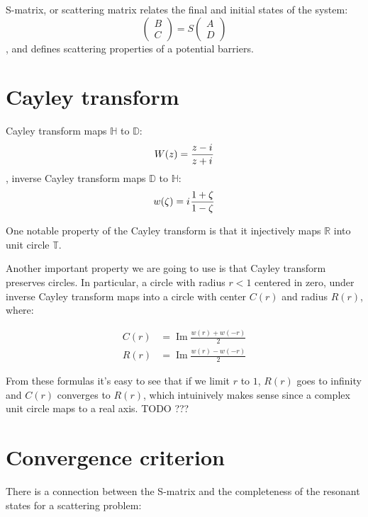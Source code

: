 \documentclass[12pt, a4paper]{article}
\theoremstyle{plain}
\newcommand{\bbD}{\mathbb{D}} %
\newcommand{\bbR}{\mathbb{R}}
\newcommand{\bbT}{\mathbb{T}} %
\newcommand{\bbH}{\mathbb{H}}
\newcommand{\iu}{{i\mkern1mu}}
\renewcommand{\Im}{\operatorname{Im}}
\begin{document}
S-matrix, or scattering matrix relates the final and initial states of the system:
\begin{equation}\label{eq:smatrix}
\begin{pmatrix} B \\ C \end{pmatrix} = S \begin{pmatrix} A \\ D \end{pmatrix}
\end{equation}
, and defines scattering properties of a potential barriers.

\section{Cayley transform}

Cayley transform maps $\bbH$ to $\bbD$:
\begin{equation}\label{eq:cayley}
W(z) = \frac{z - \iu}{z + \iu}
\end{equation}
, inverse Cayley transform maps $\bbD$ to $\bbH$:
\begin{equation}\label{eq:cayley_inverse}
w(\zeta) = \iu \frac{1 + \zeta}{1 - \zeta}
\end{equation}

One notable property of the Cayley transform is that it injectively maps $\bbR$ into unit circle $\bbT$.

Another important property we are going to use is that Cayley transform preserves circles. In particular, a circle with radius $r < 1$ centered in zero, under inverse Cayley transform maps into a circle with center $C(r)$ and radius $R(r)$, where:

\begin{equation}\label{eq:c_and_r}
\begin{aligned}
   C(r) &= \Im \frac{w(r) + w(-r)}{2}
\\ R(r) &= \Im \frac{w(r) - w(-r)}{2}
\end{aligned}
\end{equation}

From these formulas it's easy to see that if we limit $r$ to $1$, $R(r)$ goes to infinity and $C(r)$ converges to $R(r)$, which intuinively makes sense since a complex unit circle maps to a real axis. TODO ???

\section{Convergence criterion}
There is a connection between the S-matrix and the completeness of the resonant states for a scattering problem:
\end{document}
